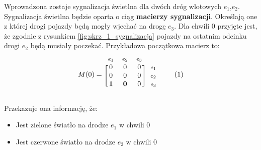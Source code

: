\documentclass[12pt]{book}
\newcommand\addtag{\refstepcounter{equation}
\renewcommand{\labelenumii}{\theenumii}
\renewcommand{\theenumii}{\theenumi.\arabic{enumii}.}
\tag{\theequation}}
\begin{document}
Wprowadzona zostaje sygnalizacja świetlna dla dwóch dróg wlotowych $e_1$,$e_2$. Sygnalizacja świetlna będzie oparta o ciąg \textbf{macierzy sygnalizacji}. Określają one z której drogi pojazdy będą mogły wjechać na drogę $e_3$. Dla chwili 0 przyjęte jest, że zgodnie z rysunkiem \ref{fig:skrz_1_sygnalizacja} pojazdy na ostatnim odcinku drogi $e_2$ będą musiały poczekać. 
Przykładowa początkowa macierz to:
\begin{equation*}
  M(0)=
  \begin{blockarray}{*{3}{c} l}
    \begin{block}{*{3}{>{$\footnotesize}c<{$}} l}
     $e_1$ & $e_2$ & $e_3$\\
    \end{block}
    \begin{block}{[*{3}{c}]>{$\footnotesize}l<{$}}
       0 & 0 & 0 & $e_1$ \\
       0 & 0 & 0 & $e_2$ \\
       \textbf{1} & \textbf{0} & 0 & $e_3$ \\
    \end{block}
  \end{blockarray} \addtag
\end{equation*}

Przekazuje ona informację, że:
\begin{itemize}
\item Jest zielone światło na drodze $e_1$ w chwili 0 
\item Jest czerwone światło na drodze $e_2$ w chwili 0
\end{itemize}
\end{document}
